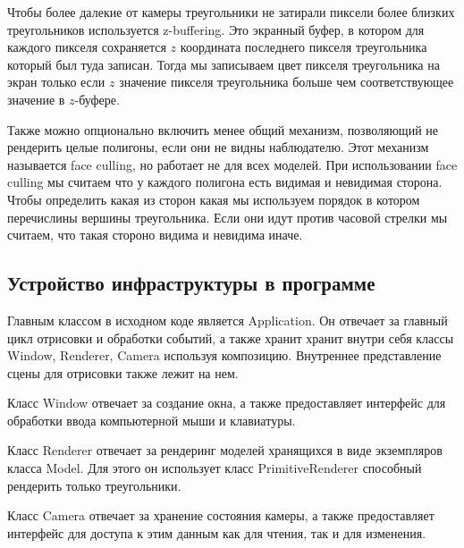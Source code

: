 \documentclass{article}
\begin{document}
Чтобы более далекие от камеры треугольники не затирали пиксели 
более близких треугольников используется z-buffering. Это 
экранный буфер, в котором для каждого пикселя сохраняется $z$ координата 
последнего пикселя треугольника который был туда записан. Тогда 
мы записываем цвет пикселя треугольника на экран только если $z$ 
значение пикселя треугольника больше чем соответствующее значение 
в $z$-буфере.

Также можно опционально включить менее общий механизм, позволяющий 
не рендерить целые полигоны, если они не видны наблюдателю. Этот 
механизм называется face culling, но работает не для всех моделей. 
При использовании face culling мы считаем что у каждого полигона есть видимая 
и невидимая сторона. Чтобы определить какая из сторон какая мы используем порядок в 
котором перечислины вершины треугольника. Если они идут против часовой стрелки мы считаем, 
что такая стороно видима и невидима иначе.

\subsection{Устройство инфраструктуры в программе}

Главным классом в исходном коде является Application. Он отвечает 
за главный цикл отрисовки и обработки событий, а также хранит хранит внутри 
себя классы Window, Renderer, Camera используя композицию. Внутреннее представление 
сцены для отрисовки также лежит на нем. 

Класс Window отвечает за создание окна, а 
также предоставляет интерфейс для обработки ввода компьютерной мыши и клавиатуры. 

Класс Renderer отвечает за рендеринг моделей хранящихся в виде экземпляров класса 
Model. Для этого он использует класс PrimitiveRenderer способный рендерить только треугольники.

Класс Camera отвечает за хранение состояния камеры, а также предоставляет 
интерфейс для доступа к этим данным как для чтения, так и для изменения.


\nocite{OpenGLMath}
\nocite{GameMath}
\nocite{CompGraphicsDynamic}
\nocite{CompGraphicsPolyg}



\end{document}

